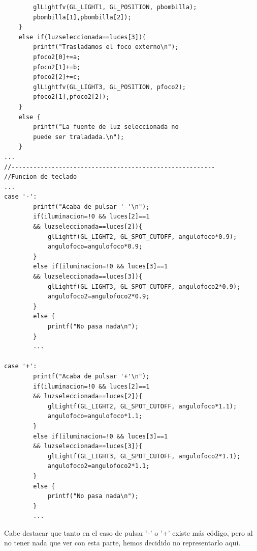 \documentclass[12pt,a4paper]{article}
\begin{document}
\begin{enumerate}
\begin{enumerate}
\begin{lstlisting}
    	glLightfv(GL_LIGHT1, GL_POSITION, pbombilla);
    	pbombilla[1],pbombilla[2]);
  	}
  	else if(luzseleccionada==luces[3]){
    	printf("Trasladamos el foco externo\n");
    	pfoco2[0]+=a;
    	pfoco2[1]+=b;
    	pfoco2[2]+=c;
    	glLightfv(GL_LIGHT3, GL_POSITION, pfoco2);
    	pfoco2[1],pfoco2[2]);
  	}
  	else {
  		printf("La fuente de luz seleccionada no 
  		puede ser traladada.\n");
  	}
...
//--------------------------------------------------------
//Funcion de teclado
...
case '-':
    	printf("Acaba de pulsar '-'\n");
    	if(iluminacion=!0 && luces[2]==1 
    	&& luzseleccionada==luces[2]){
    		glLightf(GL_LIGHT2, GL_SPOT_CUTOFF, angulofoco*0.9);
    		angulofoco=angulofoco*0.9;
    	}
    	else if(iluminacion=!0 && luces[3]==1 
    	&& luzseleccionada==luces[3]){
    		glLightf(GL_LIGHT3, GL_SPOT_CUTOFF, angulofoco2*0.9);
    		angulofoco2=angulofoco2*0.9;
    	}
    	else {
    		printf("No pasa nada\n");
    	}
    	...

case '+':
    	printf("Acaba de pulsar '+'\n");
    	if(iluminacion=!0 && luces[2]==1 
    	&& luzseleccionada==luces[2]){
    		glLightf(GL_LIGHT2, GL_SPOT_CUTOFF, angulofoco*1.1);
    		angulofoco=angulofoco*1.1;
    	}
    	else if(iluminacion=!0 && luces[3]==1 
    	&& luzseleccionada==luces[3]){
    		glLightf(GL_LIGHT3, GL_SPOT_CUTOFF, angulofoco2*1.1);
    		angulofoco2=angulofoco2*1.1;
    	}
    	else {
    		printf("No pasa nada\n");
    	}
    	...
\end{lstlisting}
Cabe destacar que tanto en el caso de pulsar '-' o '+' existe más código, pero al no tener nada que ver con esta parte, hemos decidido no representarlo aqui.
\end{enumerate}
\end{enumerate}
\end{document}
